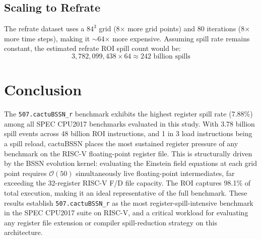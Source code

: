 \documentclass[conference]{IEEEtran}
\begin{document}
\subsection{Scaling to Refrate}

The refrate dataset uses a $84^3$ grid (8$\times$ more grid points)
and 80 iterations (8$\times$ more time steps), making it $\sim$64$\times$
more expensive. Assuming spill rate remains constant, the estimated
refrate ROI spill count would be:
\[
3{,}782{,}099{,}438 \times 64 \approx 242 \text{ billion spills}
\]

\section{Conclusion}

The \texttt{507.cactuBSSN\_r} benchmark exhibits the highest register
spill rate (7.88\%) among all SPEC CPU2017 benchmarks evaluated in
this study. With 3.78 billion spill events across 48 billion ROI
instructions, and 1 in 3 load instructions being a spill reload,
cactuBSSN places the most sustained register pressure of any benchmark
on the RISC-V floating-point register file. This is structurally
driven by the BSSN evolution kernel: evaluating the Einstein field
equations at each grid point requires $\mathcal{O}(50)$ simultaneously
live floating-point intermediates, far exceeding the 32-register
RISC-V F/D file capacity. The ROI captures 98.1\% of total execution,
making it an ideal representative of the full benchmark. These results
establish \texttt{507.cactuBSSN\_r} as the most register-spill-intensive
benchmark in the SPEC CPU2017 suite on RISC-V, and a critical workload
for evaluating any register file extension or compiler spill-reduction
strategy on this architecture.
\end{document}
